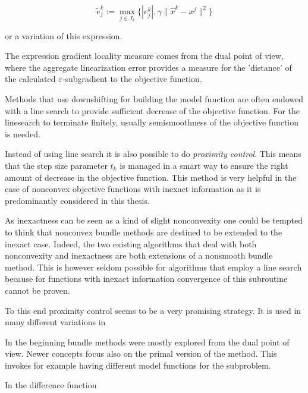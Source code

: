 \begin{equation}
	\tilde{e}_j^k := \max_{j \in J_k} \{|e_j^k|,\gamma \|\hat{x}^k-x^j\|^2\}
\label{subgr_loc_measure}
\end{equation}

or a variation of this expression.

The expression gradient locality measure comes from the dual point of view, where the aggregate linearization error provides a measure for the 'distance' of the calculated \(\varepsilon\)-subgradient to the objective function.

Methods that use downshifting for building the model function are often endowed with a line search to provide sufficient decrease of the objective function. For the linesearch to terminate finitely, usually semismoothness of the objective function is needed.

Instead of using line search it is also possible to do \emph{proximity control}. This means that the step size parameter \(t_k\) is managed in a smart way to ensure the right amount of decrease in the objective function. This method is very helpful in the case of nonconvex objective functions with inexact information as it is predominantly considered in this thesis.

As inexactness can be seen as a kind of slight nonconvexity one could be tempted to think that nonconvex bundle methods are destined to be extended to the inexact case. Indeed, the two existing algorithms \cite{Hare2016,Noll2013} that deal with both nonconvexity and inexactness are both extensions of a nonsmooth bundle method.
This is however seldom possible for algorithms that employ a line search because for functions with inexact information convergence of this subroutine cannot be proven.

To this end proximity control seems to be a very promising strategy. It is used in many different variations in \cite{Apkarian2008, Lewis2015, Noll2005, Noll2010, Noll2012, Schramm1992}

In the beginning bundle methods were mostly explored from the  dual point of view. Newer concepts focus also on the primal version of the method. This invokes for example having different model functions for the subproblem.

In \cite{Fuduli2004, Fuduli2004a} the difference function 

